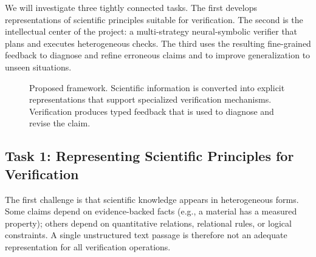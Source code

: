 \documentclass[12pt]{article}
\begin{document}
We will investigate three tightly connected tasks. The first develops representations of scientific principles suitable for verification. The second is the intellectual center of the project: a multi-strategy neural-symbolic verifier that plans and executes heterogeneous checks. The third uses the resulting fine-grained feedback to diagnose and refine erroneous claims and to improve generalization to unseen situations.

\begin{figure}[h]
\centering
{}
\caption{Proposed framework. Scientific information is converted into explicit representations that support specialized verification mechanisms. Verification produces typed feedback that is used to diagnose and revise the claim.}
\label{fig:framework}
\end{figure}

\subsection*{Task 1: Representing Scientific Principles for Verification}

The first challenge is that scientific knowledge appears in heterogeneous forms. Some claims depend on evidence-backed facts (e.g., a material has a measured property); others depend on quantitative relations, relational rules, or logical constraints. A single unstructured text passage is therefore not an adequate representation for all verification operations.
\end{document}
